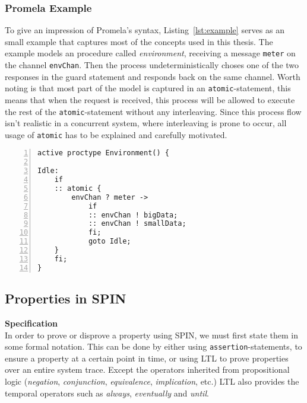
\subsubsection{Promela Example}

To give an impression of Promela's syntax, Listing~\ref{lst:example} serves as an small example that captures most of the concepts used in this thesis. The example models an procedure called \textit{environment}, receiving a message \texttt{meter} on the channel \texttt{envChan}. Then the process undeterministically choses one of the two responses in the guard statement and responds back on the same channel. Worth noting is that most part of the model is captured in an \texttt{atomic}-statement, this means that when the request is received, this process will be allowed to execute the rest of the \texttt{atomic}-statement without any interleaving. 
Since this process flow isn't realistic in a concurrent system, where interleaving is prone to occur, all usage of \texttt{atomic} has to be explained and carefully motivated. 

\begin{lstlisting}[caption={Promela Example},label={lst:example},language=Promela, numbers=left, basicstyle=\footnotesize, tabsize=2]
active proctype Environment() {

Idle:  
	if
	:: atomic { 
		envChan ? meter ->  
			if
			:: envChan ! bigData;
			:: envChan ! smallData;
			fi; 
			goto Idle;
	}
	fi;
}
\end{lstlisting}

\subsection{Properties in SPIN}



\textbf{Specification} \\

In order to prove or disprove a property using SPIN, we must first state them in some formal notation. This can be done by either using \texttt{assertion}-statements, to ensure a property at a certain point in time, or using LTL to prove properties over an entire system trace. 
Except the operators inherited from propositional logic (\textit{negation}, \textit{conjunction}, \textit{equivalence}, \textit{implication}, etc.) LTL also provides the temporal operators such as \textit{always}, \textit{eventually} and \textit{until}.  

